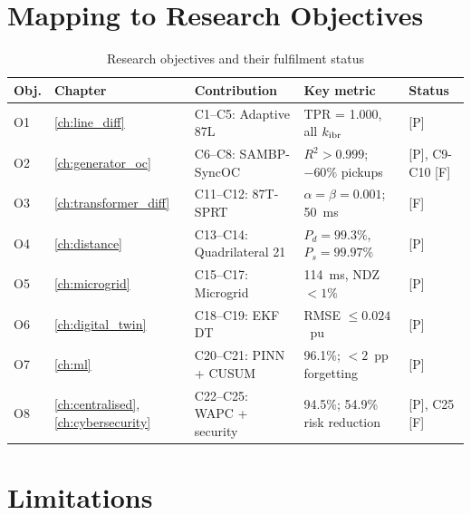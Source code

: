 \section{Mapping to Research Objectives}
\label{sec:ch13_objectives}

\begin{table}[htbp]
\caption{Research objectives and their fulfilment status}
\label{tab:ch13_objectives}
\small
\begin{tabularx}{\textwidth}{@{}lp{2cm}p{4cm}p{3cm}l@{}}
\toprule
Obj. & Chapter & Contribution & Key metric & Status \\
\midrule
O1 & \ref{ch:line_diff} & C1--C5: Adaptive 87L
  & TPR = 1.000, all $k_\mathrm{ibr}$ & [P] \\
O2 & \ref{ch:generator_oc} & C6--C8: SAMBP-SyncOC
  & $R^2 > 0.999$; $-60\%$ pickups & [P], C9-C10 [F] \\
O3 & \ref{ch:transformer_diff} & C11--C12: 87T-SPRT
  & $\alpha = \beta = 0.001$; 50~ms & [F] \\
O4 & \ref{ch:distance} & C13--C14: Quadrilateral 21
  & $P_d = 99.3\%$, $P_s = 99.97\%$ & [P] \\
O5 & \ref{ch:microgrid} & C15--C17: Microgrid
  & 114~ms, NDZ $< 1\%$ & [P] \\
O6 & \ref{ch:digital_twin} & C18--C19: EKF DT
  & RMSE $\leq 0.024$~pu & [P] \\
O7 & \ref{ch:ml} & C20--C21: PINN + CUSUM
  & 96.1\%; $< 2$~pp forgetting & [P] \\
O8 & \ref{ch:centralised},\ref{ch:cybersecurity} & C22--C25: WAPC + security
  & 94.5\%; 54.9\% risk reduction & [P], C25 [F] \\
\bottomrule
\end{tabularx}
\end{table}

\section{Limitations}
\label{sec:ch13_limitations}

